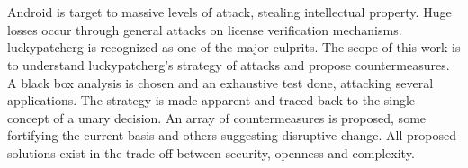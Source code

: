 \chapter{\abstractname}
Android is target to massive levels of attack, stealing intellectual property.
Huge losses occur through general attacks on license verification mechanisms.
\gls{luckypatcherg} is recognized as one of the major culprits.
The scope of this work is to understand \gls{luckypatcherg}’s strategy of attacks and propose countermeasures.
A black box analysis is chosen and an exhaustive test done, attacking several applications.
The strategy is made apparent and traced back to the single concept of a unary decision.
An array of countermeasures is proposed, some fortifying the current basis and others suggesting disruptive change.
All proposed solutions exist in the trade off between security, openness and complexity.
